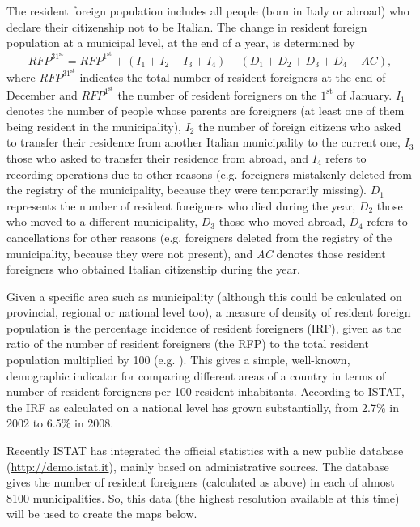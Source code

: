 The resident foreign population includes all people (born in Italy or abroad) who declare their citizenship not to be Italian. The change in resident foreign population at a municipal level, at the end of a year, is determined by
\begin{equation}
RFP^{31^\text{st}} = RFP^{1^\text{st}} + (I_1 + I_2 + I_3+ I_4) - (D_1 + D_2 + D_3 + D_4 + AC),
\label{it-rfp}
\end{equation}
where $RFP^{31^\text{st}}$ indicates the total number of resident foreigners at the end of December and $RFP^{1^\text{st}}$ the number of resident foreigners on the $1^\text{st}$ of January. $I_{1}$ denotes the number of people whose parents are foreigners (at least one of them being resident in the municipality), $I_{2}$ the number of foreign citizens who asked to transfer their residence from another Italian municipality to the current one, $I_{3}$ those who asked to transfer their residence from abroad, and $I_{4}$ refers to recording operations due to other reasons (e.g. foreigners mistakenly deleted from the registry of the municipality, because they were temporarily missing). $D_{1}$ represents the number of resident foreigners who died during the year, $D_{2}$ those who moved to a different municipality, $D_{3}$ those who moved abroad, $D_{4}$ refers to cancellations for other reasons (e.g. foreigners deleted from the registry of the municipality, because they were not present), and \textit{AC} denotes those resident foreigners who obtained Italian citizenship during the year. 

Given a specific area such as municipality (although this could be calculated on provincial, regional or national level too), a measure of density of resident foreign population is the percentage incidence of resident foreigners (IRF), given as the ratio of the number of resident foreigners (the RFP) to the total resident population multiplied by 100 (e.g. \cite{Lowell2007}). This gives a simple, well-known, demographic indicator for comparing different areas of a country in terms of number of resident foreigners per 100 resident inhabitants. According to ISTAT, the IRF as calculated on a national level has grown substantially, from 2.7\% in 2002 to 6.5\% in 2008. 

Recently ISTAT has integrated the official statistics with a new public database (\url{http://demo.istat.it}), mainly based on administrative sources. The database gives the number of resident foreigners (calculated as above) in each of almost 8100 municipalities. So, this data (the highest resolution available at this time) will be used to create the maps below.


